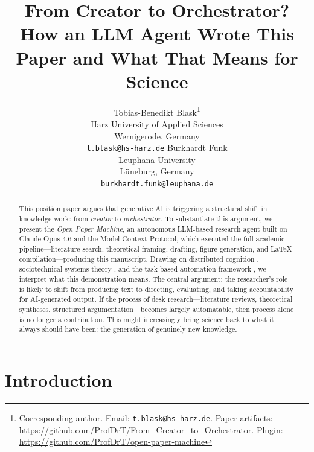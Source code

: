 \documentclass{article}
\title{From Creator to Orchestrator? How an LLM Agent Wrote This Paper
and What That Means for Science}
\author{
  Tobias-Benedikt Blask\thanks{Corresponding author. Email: \texttt{t.blask@hs-harz.de}. Paper artifacts: \url{https://github.com/ProfDrT/From_Creator_to_Orchestrator}. Plugin: \url{https://github.com/ProfDrT/open-paper-machine}}\\
  Harz University of Applied Sciences\\
  Wernigerode, Germany\\
  \texttt{t.blask@hs-harz.de}
  \And
  Burkhardt Funk\\
  Leuphana University\\
  L\"uneburg, Germany\\
  \texttt{burkhardt.funk@leuphana.de}
}
\date{}
\begin{document}
\raggedbottom

\maketitle

\noindent{}

\vspace{1em}


\begin{abstract}
This position paper argues that generative AI is triggering a structural shift in knowledge work: from \textit{creator} to \textit{orchestrator}. To substantiate this argument, we present the \textit{Open Paper Machine}, an autonomous LLM-based research agent built on Claude Opus 4.6 and the Model Context Protocol, which executed the full academic pipeline---literature search, theoretical framing, drafting, figure generation, and \LaTeX{} compilation---producing this manuscript. Drawing on distributed cognition \citep{hutchins1995cognition}, sociotechnical systems theory \citep{trist1951social}, and the task-based automation framework \citep{autor2015why}, we interpret what this demonstration means. The central argument: the researcher's role is likely to shift from producing text to directing, evaluating, and taking accountability for AI-generated output. If the process of desk research---literature reviews, theoretical syntheses, structured argumentation---becomes largely automatable, then process alone is no longer a contribution. This might increasingly bring science back to what it always should have been: the generation of genuinely new knowledge.
\end{abstract}

\section{Introduction}
\end{document}
